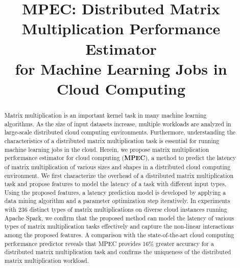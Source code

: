 \documentclass[10pt, conference, compsocconf]{IEEEtran}
\begin{document}

\title{MPEC: Distributed Matrix Multiplication Performance Estimator \\for Machine Learning Jobs in Cloud Computing}

\author{
\and
{}
}

\maketitle

\begin{abstract}
  Matrix multiplication is an important kernel task in many machine learning algorithms. As the size of input datasets increase, multiple workloads are analyzed in large-scale distributed cloud computing environments. Furthermore, understanding the characteristics of a distributed matrix multiplication task is essential for running machine learning jobs in the cloud. Herein, we propose matrix multiplication performance estimator for cloud computing (\textbf{MPEC}), a method to predict the latency of matrix multiplication of various sizes and shapes in a distributed cloud computing environment. We first characterize the overhead of a distributed matrix multiplication task and propose features to model the latency of a task with different input types. Using the proposed features, a latency prediction model is developed by applying a data mining algorithm and a parameter optimization step iteratively. In experiments with 236 distinct types of matrix multiplications on diverse cloud instances running Apache Spark, we confirm that the proposed method can model the latency of various types of matrix multiplication tasks effectively and capture the non-linear interactions among the proposed features. A comparison with the state-of-the-art cloud computing performance predictor reveals that MPEC provides 16\% greater accuracy for a distributed matrix multiplication task and confirms the uniqueness of the distributed matrix multiplication workload.
\end{abstract}
\end{document}
